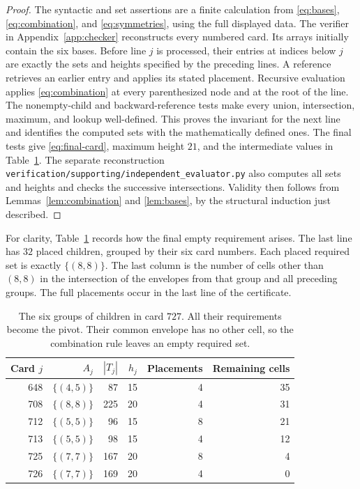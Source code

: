 \begin{proof}
The syntactic and set assertions are a finite calculation from
\eqref{eq:bases}, \eqref{eq:combination}, and
\eqref{eq:symmetries}, using the full displayed data.
The verifier in Appendix~\ref{app:checker} reconstructs every
numbered card. Its arrays initially contain the six bases.
Before line $j$ is processed, their entries at indices below $j$
are exactly the sets and heights specified by the preceding lines.
A reference retrieves an earlier entry and applies its stated
placement. Recursive evaluation applies \eqref{eq:combination}
at every parenthesized node and at the root of the line.
The nonempty-child and backward-reference tests make every union,
intersection, maximum, and lookup well-defined. This proves the
invariant for the next line and identifies the computed sets with
the mathematically defined ones. The final tests give
\eqref{eq:final-card}, maximum height $21$, and the intermediate
values in Table~\ref{tab:top}. The separate reconstruction
\nolinkurl{verification/supporting/independent_evaluator.py} also computes all
sets and heights and checks the successive intersections.
Validity then follows from Lemmas~\ref{lem:combination} and
\ref{lem:bases}, by the structural induction just described.
\end{proof}

For clarity, Table~\ref{tab:top} records how the final empty
requirement arises. The last line has $32$ placed children,
grouped by their six card numbers. Each placed required set is
exactly $\{(8,8)\}$. The last column is the number of cells other
than $(8,8)$ in the intersection of the envelopes from that group
and all preceding groups. The full placements occur in the last
line of the certificate.

\begin{table}[tb]
\centering
\begin{tabular}{rrrrrr}
\toprule
Card $j$ & $A_j$ & $|T_j|$ & $h_j$ & Placements & Remaining cells\\
\midrule
648 & $\{(4,5)\}$ & 87  & 15 & 4 & 35\\
708 & $\{(8,8)\}$ & 225 & 20 & 4 & 31\\
712 & $\{(5,5)\}$ & 96  & 15 & 8 & 21\\
713 & $\{(5,5)\}$ & 98  & 15 & 4 & 12\\
725 & $\{(7,7)\}$ & 167 & 20 & 8 & 4\\
726 & $\{(7,7)\}$ & 169 & 20 & 4 & 0\\
\bottomrule
\end{tabular}
\caption{The six groups of children in card $727$. All their
requirements become the pivot. Their common envelope has no other
cell, so the combination rule leaves an empty required set.}
\label{tab:top}
\end{table}

